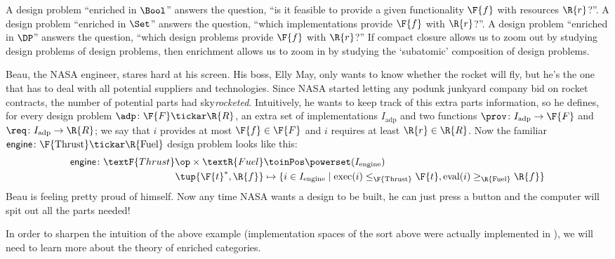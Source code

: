 \label{sec:enriched}
A design problem ``enriched in $\Bool$'' answers the question, ``is it feasible to provide a given functionality $\F{f}$ with resources $\R{r}$?''.  A design problem ``enriched in $\Set$'' answers the question, ``which implementations provide $\F{f}$ with $\R{r}$?''. A design problem ``enriched in $\DP$'' answers the question, ``which design problems provide $\F{f}$ with $\R{r}$?'' If compact closure allows us to zoom out by studying design problems of design problems, then enrichment allows us to zoom in by studying the `subatomic' composition of design problems.

\begin{example}\label{ex:dpi_example}
Beau, the NASA engineer, stares hard at his screen. His boss, Elly May, only wants to know whether the rocket will fly, but he's the one that has to deal with all potential suppliers and technologies. Since NASA started letting any podunk junkyard company bid on rocket contracts, the number of potential parts had sky\emph{rocketed}. Intuitively, he wants to keep track of this extra parts information, so he defines, for every design problem $\adp \colon \F{F} \tickar \R{R}$, an extra set of implementations $I_\text{adp}$ and two functions $\prov\colon I_\text{adp} \to \F{F}$ and  $\req\colon I_\text{adp} \to \R{R}$; we say that $i$ provides at most $\F{f} \in \F{F}$ and $i$ requires at least $\R{r} \in \R{R}$. Now the familiar $\mathsf{engine} \colon \F{\text{Thrust}} \tickar \R{\text{Fuel}}$ design problem looks like this:
\begin{equation}
\begin{aligned}
\mathsf{engine} \colon \textF{Thrust}\op \times \textR{Fuel} &\toinPos \powerset(I_\text{engine}) \\
\tup{\F{t}^*,\R{f}} &\mapsto \{ i \in I_\text{engine} \mid \text{exec}(i) \leq_\F{\text{Thrust}} \F{t}, \text{eval}(i) \geq_\R{\text{Fuel}} \R{f} \}
\end{aligned}
\end{equation}
Beau is feeling pretty proud of himself. Now any time NASA wants a design to be built, he can just press a button and the computer will spit out all the parts needed!
\end{example}

In order to sharpen the intuition of the above example (implementation spaces of the sort above were actually implemented in \cite{censi}), we will need to learn more about the theory of enriched categories.

